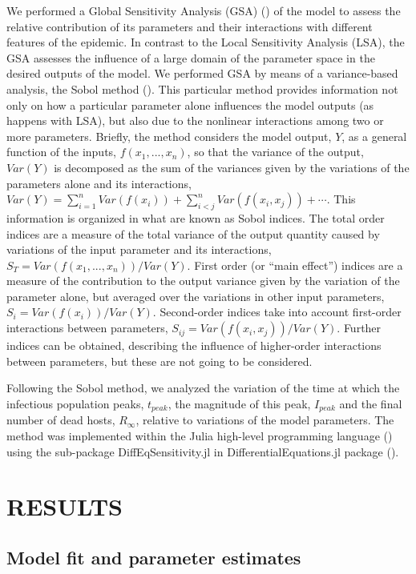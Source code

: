 We performed a Global Sensitivity Analysis (GSA)
(\cite{Sensitivity_analysis_book}) of the model to assess the relative
contribution of its parameters and their interactions with different features
of the epidemic. In contrast to the Local Sensitivity Analysis (LSA), the GSA
assesses the influence of a large domain of the parameter space in the desired
outputs of the model. We performed GSA by means of a variance-based analysis,
the Sobol method (\cite{SOBOL2001271}). This particular method provides
information not only on how a particular parameter alone influences the model
outputs (as happens with LSA), but also due to the nonlinear interactions among
two or more parameters. Briefly, the method considers the model output, $Y$, as
a general function of the inputs, $f(x_1, ..., x_n)$, so that the variance of
the output, $Var(Y)$ is decomposed as the sum of the variances given by the
variations of the parameters alone and its interactions,
$Var(Y)=\sum_{i=1}^nVar(f(x_i)) + \sum_{i<j}^nVar(f(x_i, x_j)) + \cdots$. This
information is organized in what are known as Sobol indices. The total order
indices are a measure of the total variance of the output quantity caused by
variations of the input parameter and its interactions,
$S_T=Var(f(x_1,...,x_n))/Var(Y)$. First order (or ``main effect'') indices are
a measure of the contribution to the output variance given by the variation of
the parameter alone, but averaged over the variations in other input
parameters, $S_i=Var(f(x_i))/Var(Y)$. Second-order indices take into account
first-order interactions between parameters, $S_{ij}=Var(f(x_i,x_j)) / Var(Y)$.
Further indices can be obtained, describing the influence of higher-order
interactions between parameters, but these are not going to be considered.

Following the Sobol method, we analyzed the variation of the time at which
the infectious population peaks, $t_{peak}$, the magnitude of this peak,
$I_{peak}$ and the final number of dead hosts, $R_{\infty}$, relative to
variations of the model parameters. The method was implemented within the Julia
high-level programming language (\cite{julia}) using the sub-package
DiffEqSensitivity.jl in DifferentialEquations.jl package
(\cite{DifferentialEquations.jl}).

\section{RESULTS}

\subsection{Model fit and parameter estimates}

